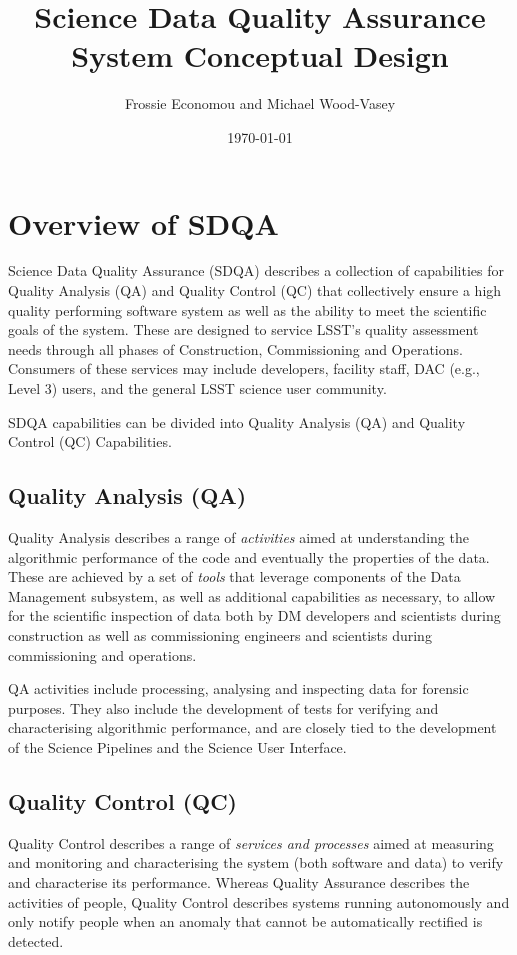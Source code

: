 \documentclass[DM,toc,lsstdraft]{lsstdoc}
\title{Science Data Quality Assurance System Conceptual Design}
\author{Frossie Economou and Michael Wood-Vasey}
\date{\today}
\begin{document}
\maketitle

\section{Overview of SDQA}

Science Data Quality Assurance (SDQA) describes a collection of
capabilities for Quality Analysis (QA) and Quality Control (QC) that
collectively ensure a high quality performing software system as well
as the ability to meet the scientific goals of the system. These are
designed to service LSST's quality assessment needs through all phases
of Construction, Commissioning and Operations. Consumers of these
services may include developers, facility staff, DAC (e.g., Level 3)
users, and the general LSST science user community.

SDQA capabilities can be divided into Quality Analysis (QA) and
Quality Control (QC) Capabilities.

\subsection{Quality Analysis (QA)}

Quality Analysis describes a range of \emph{activities} aimed at understanding the algorithmic performance of the code and eventually the properties of the data. These are achieved by a set of \emph{tools} that leverage components of the Data Management subsystem, as well as additional capabilities as necessary, to allow for the scientific inspection of data both by DM developers and scientists during construction as well as commissioning engineers and scientists during commissioning and operations.

QA activities include processing, analysing and inspecting data for forensic purposes. They also include the development of tests for verifying and characterising algorithmic performance, and are closely tied to the development of the Science Pipelines and the Science User Interface.

\subsection{Quality Control (QC)}

Quality Control describes a range of \emph{services and processes} aimed at measuring and monitoring and characterising the system (both software and data) to verify and characterise its performance. Whereas Quality Assurance describes the activities of people, Quality Control describes systems running autonomously and only notify people when an anomaly that cannot be automatically rectified is detected.
\end{document}
